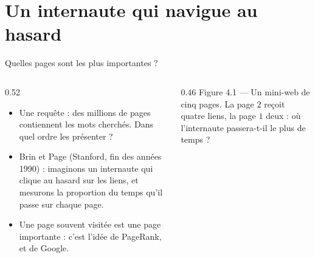 \section{Un internaute qui navigue au hasard}

\begin{frame}{Quelles pages sont les plus importantes ?}
  \begin{columns}[c]
    \begin{column}{0.52\textwidth}
      \small
      \begin{itemize}
        \item Une requête : des millions de pages contiennent les mots
          cherchés. Dans quel ordre les présenter ?
        \item Brin et Page (Stanford, fin des années 1990) : imaginons un
          internaute qui clique au hasard sur les liens, et mesurons la
          proportion du temps qu'il passe sur chaque page.
        \item Une page souvent visitée est une page importante : c'est
          l'idée de PageRank, et de Google.
      \end{itemize}
    \end{column}
    \begin{column}{0.46\textwidth}
      \scriptsize Figure 4.1 --- Un mini-web de cinq pages. La page $2$
      reçoit quatre liens, la page $1$ deux : où l'internaute
      passera-t-il le plus de temps ?
    \end{column}
  \end{columns}
\end{frame}

